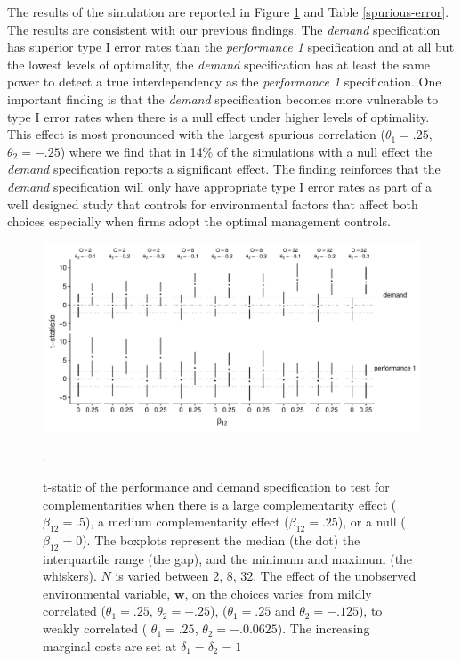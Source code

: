 \documentclass[12pt]{article}
\begin{document}
The results of the simulation are reported in Figure \ref{spurious} and
Table \ref{spurious-error}. The results are consistent with our previous
findings. The \emph{demand} specification has superior type I error
rates than the \emph{performance 1} specification and at all but the
lowest levels of optimality, the \emph{demand} specification has at
least the same power to detect a true interdependency as the
\emph{performance 1} specification. One important finding is that the
\emph{demand} specification becomes more vulnerable to type I error
rates when there is a null effect under higher levels of optimality.
This effect is most pronounced with the largest spurious correlation
(\(\theta_1 = .25\), \(\theta_2 = -.25\)) where we find that in 14\% of
the simulations with a null effect the \emph{demand} specification
reports a significant effect. The finding reinforces that the
\emph{demand} specification will only have appropriate type I error
rates as part of a well designed study that controls for environmental
factors that affect both choices especially when firms adopt the optimal
management controls.

\begin{figure}

\includegraphics[width=500px]{figure-latex/spurious_plot.pdf}
\caption[Error Rate and Power with Unobserved Environmental Variables]
{\label{spurious} t-static of the performance and demand specification to test
for complementarities when there is a large complementarity effect
($\beta_{12} = .5$), a medium complementarity effect ($\beta_{12} = .25$),
or a null ($\beta_{12} = 0$). The boxplots represent the median (the dot) the
interquartile range (the gap), and the minimum and maximum (the whiskers). $N$
is varied between 2, 8, 32. The effect of the unobserved environmental variable,
$\mathbf{w}$, on the choices varies from mildly correlated ($\theta_1 = .25$,
$\theta_2 = -.25$), ($\theta_1 = .25$ and $\theta_2 = -.125$),
to weakly correlated ( $\theta_1 =.25$, $\theta_2 = -.0.0625$). The increasing
marginal costs are set at $\delta_1 = \delta_2 = 1$}.
\end{figure}
\end{document}
